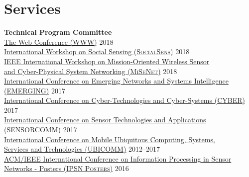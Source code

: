 
\section{\sc Services}
{\bf Technical Program Committee}\\
{\href{https://www2018.thewebconf.org/}{The Web Conference (\textsc{WWW})}} \hfill 2018\\
{\href{https://www.cse.buffalo.edu/~lusu/SocialSens2018/}{International Workshop on Social Sensing (\textsc{SocialSens})}} \hfill 2018\\
{\href{http://infocom2018.ieee-infocom.org/content/workshop-misenet-mission-oriented-wireless-sensor-networking}{IEEE International Workshop on Mission-Oriented Wireless Sensor \\\mbox{\hspace{0.4cm}} and Cyber-Physical System Networking (\textsc{MiSeNet})}} \hfill 2018\\
{\href{http://www.iaria.org/conferences2017/EMERGING17.html}{International Conference on Emerging Networks and Systems Intelligence (\textsc{EMERGING})}} \hfill 2017\\
{\href{http://www.iaria.org/conferences2017/CYBER17.html}{International Conference on Cyber-Technologies and Cyber-Systems (\textsc{CYBER})}} \hfill 2017\\
{\href{http://www.iaria.org/conferences2017/SENSORCOMM17.html}{International Conference on Sensor Technologies and Applications (\textsc{SENSORCOMM})}} \hfill 2017\\
{\href{http://www.iaria.org/conferences2017/UBICOMM17.html}{International Conference on Mobile Ubiquitous Computing, Systems,\\\mbox{\hspace{0.4cm}} Services and Technologies (\textsc{UBICOMM})}} \hfill 2012--2017\\
{\href{http://ipsn.acm.org/2016/posters.html}{ACM/IEEE International Conference on Information Processing in Sensor\\\mbox{\hspace{0.4cm}} Networks - Posters (\textsc{IPSN Posters})}} \hfill 2016\\
\vspace{-0.6cm}

